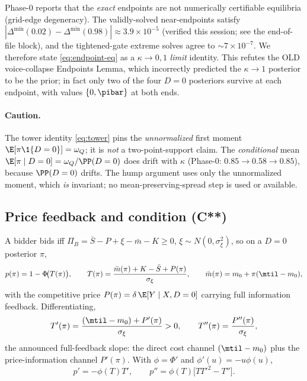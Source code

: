 \begin{remark}
\label{rem:endpoint-limit}
Phase-0 reports that the \emph{exact} endpoints are not numerically certifiable
equilibria (grid-edge degeneracy). The validly-solved near-endpoints satisfy
$|\Delta^{\min}(0.02)-\Delta^{\min}(0.98)|\approx3.9\times10^{-5}$ (verified
this session; see the end-of-file block), and the tightened-gate extreme solves
agree to $\sim7\times10^{-7}$. We therefore state \eqref{eq:endpoint-eq} as a
$\kappa\to0,1$ \emph{limit} identity. This refutes the OLD voice-collapse
Endpoints Lemma, which incorrectly predicted the $\kappa\to1$ posterior to be
the prior; in fact only two of the four $D=0$ posteriors survive at each
endpoint, with values $\{0,\pibar\}$ at both ends.
\end{remark}

\paragraph{Caution.}
The tower identity \eqref{eq:tower} pins the \emph{unnormalized} first moment
$\E[\pi\1\{D=0\}]=\omega_Q$; it is \emph{not} a two-point-support claim. The
\emph{conditional} mean $\E[\pi\mid D=0]=\omega_Q/\PP(D=0)$ does drift with
$\kappa$ (Phase-0: $0.85\to0.58\to0.85$), because $\PP(D=0)$ drifts. The
hump argument uses only the unnormalized moment, which \emph{is} invariant;
no mean-preserving-spread step is used or available.

\subsection*{Price feedback and condition \texorpdfstring{(C**)}{(C**)}}

A bidder bids iff $\Pi_B=\bar S-P+\xi-\bar m-K\ge0$, $\xi\sim N(0,\sigma_\xi^2)$,
so on a $D=0$ posterior $\pi$,
\begin{equation}
  p(\pi)=1-\Phi\!\big(T(\pi)\big),\qquad
  T(\pi)=\frac{\bar m(\pi)+K-\bar S+P(\pi)}{\sigma_\xi},\qquad
  \bar m(\pi)=m_0+\pi(\mtil-m_0),
  \label{eq:T-def}
\end{equation}
with the competitive price $P(\pi)=\delta\,\E[Y\mid X,D=0]$ carrying full
information feedback. Differentiating,
\begin{equation}
  T'(\pi)=\frac{(\mtil-m_0)+P'(\pi)}{\sigma_\xi}>0,\qquad
  T''(\pi)=\frac{P''(\pi)}{\sigma_\xi},
  \label{eq:Tprime}
\end{equation}
the announced full-feedback slope: the direct cost channel $(\mtil-m_0)$ plus
the price-information channel $P'(\pi)$. With $\phi=\Phi'$ and
$\phi'(u)=-u\phi(u)$,
\begin{equation}
  p'=-\phi(T)T',\qquad
  p''=\phi(T)\big[T T'^2-T''\big].
  \label{eq:pp}
\end{equation}

